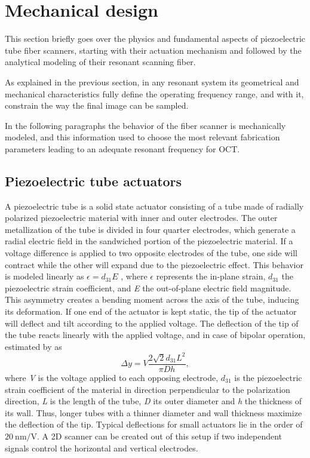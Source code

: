 \documentclass[10pt]{iopart}
\begin{document}
\section{Mechanical design}

This section briefly goes over the physics and fundamental aspects of piezoelectric tube fiber scanners, starting with their actuation mechanism and followed by the analytical modeling of their resonant scanning fiber.


As explained in the previous section, in any resonant system its geometrical and mechanical characteristics fully define the operating frequency range, and with it, constrain the way the final image can be sampled.

In the following paragraphs the behavior of the fiber scanner is mechanically modeled, and this information used to choose the most relevant fabrication parameters leading to an adequate resonant frequency for OCT.

\subsection{Piezoelectric tube actuators}
\label{ssec:piezo}
A piezoelectric tube is a solid state actuator consisting of a tube made of radially polarized piezoelectric material with inner and outer electrodes. The outer metallization of the tube is divided in four quarter electrodes, which generate a radial electric field in the sandwiched portion of the piezoelectric material. If a voltage difference is applied to two opposite electrodes of the tube, one side will contract while the other will expand due to the piezoelectric effect. This behavior is modeled linearly  as $\epsilon = d_{31} E$ \cite{Arnau2008}, where $\epsilon$ represents the in-plane strain, $d_{31}$ the piezoelectric strain coefficient, and \textit{E} the out-of-plane electric field magnitude. This asymmetry creates a bending moment across the axis of the tube, inducing its deformation. If one end of the actuator is kept static, the tip of the actuator will deflect and tilt according to the applied voltage. The deflection of the tip of the tube reacts linearly with the applied voltage, and in case of bipolar operation, estimated by \cite{Chen} as
\begin{equation}
\Delta y = V  \frac{2 \sqrt{2} d_{31} L^2}{\pi D h},
\end{equation}
where \textit{V} is the voltage applied to each opposing electrode, $d_{31}$ is the piezoelectric strain coefficient of the material in direction perpendicular to the polarization direction, \textit{L} is the length of the tube, \textit{D} its outer diameter and \textit{h} the thickness of its wall. Thus, longer tubes with a thinner diameter and wall thickness maximize the deflection of the tip. Typical deflections for small actuators lie in the order of $\SI{20}{\nano\meter / \volt}$.
A 2D scanner can be created out of this setup if two independent signals control the horizontal and vertical electrodes.
\end{document}

